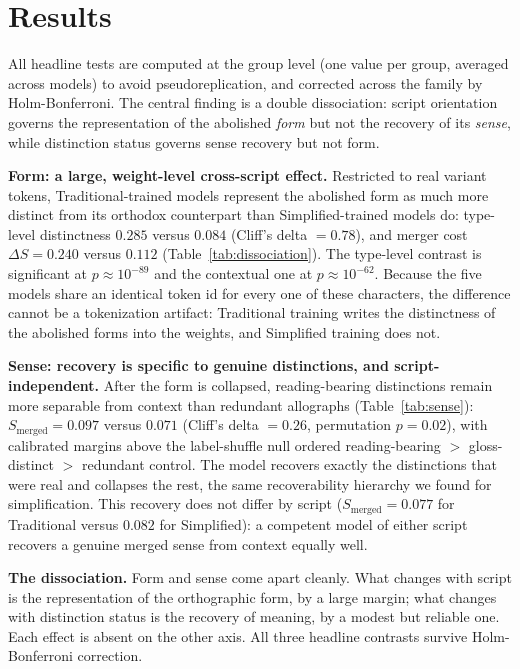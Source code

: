 \documentclass[10pt,twocolumn]{article}
\begin{document}
\section{Results}
All headline tests are computed at the group level (one value per group, averaged
across models) to avoid pseudoreplication, and corrected across the family by
Holm-Bonferroni. The central finding is a double dissociation: script orientation
governs the representation of the abolished \emph{form} but not the recovery of
its \emph{sense}, while distinction status governs sense recovery but not form.

\noindent\textbf{Form: a large, weight-level cross-script effect.} Restricted to
real variant tokens, Traditional-trained models represent the abolished form as
much more distinct from its orthodox counterpart than Simplified-trained models
do: type-level distinctness $0.285$ versus $0.084$ (Cliff's delta $= 0.78$), and
merger cost $\Delta S = 0.240$ versus $0.112$ (Table~\ref{tab:dissociation}). The
type-level contrast is significant at $p \approx 10^{-89}$ and the contextual one
at $p \approx 10^{-62}$. Because the five models share an identical token id for
every one of these characters, the difference cannot be a tokenization artifact:
Traditional training writes the distinctness of the abolished forms into the
weights, and Simplified training does not.

\noindent\textbf{Sense: recovery is specific to genuine distinctions, and
script-independent.} After the form is collapsed, reading-bearing distinctions
remain more separable from context than redundant allographs
(Table~\ref{tab:sense}): $S_{\mathrm{merged}} = 0.097$ versus $0.071$ (Cliff's
delta $= 0.26$, permutation $p = 0.02$), with calibrated margins above the
label-shuffle null ordered reading-bearing $>$ gloss-distinct $>$ redundant
control. The model recovers exactly the distinctions that were real and collapses
the rest, the same recoverability hierarchy we found for simplification. This
recovery does not differ by script ($S_{\mathrm{merged}} = 0.077$ for Traditional
versus $0.082$ for Simplified): a competent model of either script recovers a
genuine merged sense from context equally well.

\noindent\textbf{The dissociation.} Form and sense come apart cleanly. What
changes with script is the representation of the orthographic form, by a large
margin; what changes with distinction status is the recovery of meaning, by a
modest but reliable one. Each effect is absent on the other axis. All three
headline contrasts survive Holm-Bonferroni correction.
\end{document}
